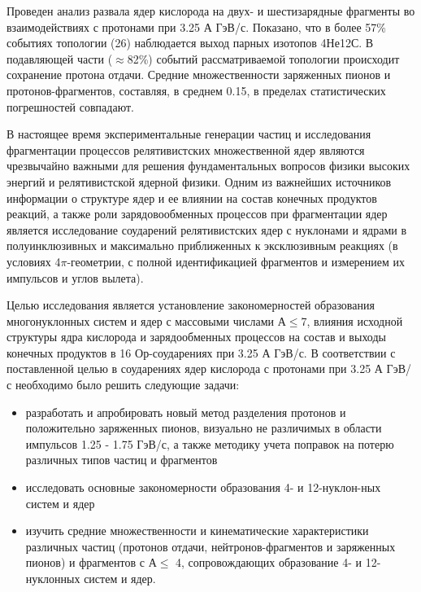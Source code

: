 \documentclass[fontsize=14pt]{scrarticle}
\begin{document}
   Проведен анализ развала ядер кислорода на двух- и шестизарядные фрагменты во взаимодействиях с протонами при 3.25 А ГэВ/с. Показано, что в более 57\% событиях топологии (26) наблюдается выход парных изотопов 4Не12С. В подавляющей части ($\approx$82\%) событий рассматриваемой топологии происходит сохранение протона отдачи. Средние множественности заряженных пионов и протонов-фрагментов, составляя, в среднем 0.15, в пределах статистических погрешностей совпадают. 
   
   В настоящее время экспериментальные генерации частиц и исследования     фрагментации процессов релятивистских множественной ядер являются чрезвычайно важными для решения фундаментальных вопросов физики  высоких энергий и релятивистской ядерной физики. Одним из важнейших источников информации о структуре ядер и ее влиянии на состав конечных продуктов реакций, а также роли зарядовообменных процессов при фрагментации ядер является исследование соударений релятивистских ядер с нуклонами и ядрами в полуинклюзивных и максимально приближенных к эксклюзивным реакциях (в условиях 4$\pi$-геометрии, с полной идентификацией фрагментов и измерением их импульсов и углов вылета). 
   
   Целью исследования является установление закономерностей образования многонуклонных систем и ядер с массовыми числами А$\le$7, влияния исходной структуры ядра кислорода и зарядообменных процессов на состав и выходы конечных продуктов в 16 Ор-соударениях при 3.25 А ГэВ/с. В соответствии с поставленной целью в соударениях ядер кислорода с протонами при 3.25 А ГэВ/с необходимо было решить следующие задачи:
\begin{itemize}
    \item разработать и апробировать новый метод разделения протонов и положительно заряженных пионов, визуально не различимых в области импульсов 1.25 - 1.75 ГэВ/с, а также методику учета поправок на потерю различных типов частиц и фрагментов
    \item исследовать основные закономерности образования 4- и 12-нуклон-ных систем и ядер
    \item изучить средние множественности и кинематические характеристики различных частиц (протонов отдачи, нейтронов-фрагментов и заряженных пионов) и фрагментов с А$\le$ 4, сопровождающих образование 4- и 12- нуклонных систем и ядер.
    \end{itemize}
    
\end{document}
